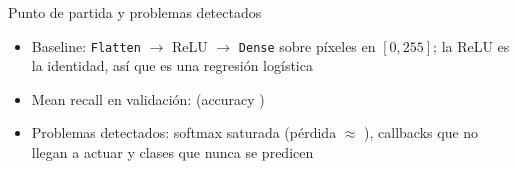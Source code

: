 \begin{frame}{Punto de partida y problemas detectados}
  \begin{itemize}
    \item Baseline: \texttt{Flatten} $\rightarrow$ ReLU $\rightarrow$ \texttt{Dense} sobre píxeles en $[0, 255]$; la ReLU es la identidad, así que es una regresión logística
    \item Mean recall en validación: \textbf{} (accuracy )
    \item Problemas detectados: softmax saturada (pérdida $\approx$ ), callbacks que no llegan a actuar y clases que nunca se predicen
  \end{itemize}
  \vspace{0.3cm}
\end{frame}
